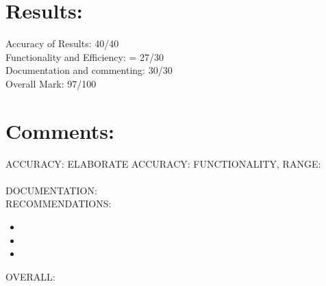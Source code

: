 \documentclass[11pt]{article} %
\begin{document}

\section{Results:}

Accuracy of Results: 40/40 \\
Functionality and Efficiency: = 27/30 \\ 
Documentation and commenting: 30/30 \\ 
Overall Mark: 97/100 \\

\section{Comments:}

ACCURACY:
ELABORATE ACCURACY:
FUNCTIONALITY, RANGE:
\\
\\ 
DOCUMENTATION:
\\
RECOMMENDATIONS:
\begin{itemize}
\item {}
\item {}
\item {}
\end{itemize}
OVERALL: 
\end{document}
